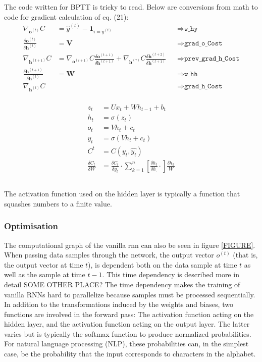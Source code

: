 \documentclass[12pt]{article}
\begin{document}
The code written for BPTT is tricky to read. Below are conversions from math to code for gradient calculation of eq. (21):
\begin{align*}
    \nabla_{\mathbf{o}^{(t)}} C &= \hat{y}^{(t)} - \mathbf{1}_{i=y^{(t)}} &&\Rightarrow \texttt{w\_hy} \\
    \frac{\delta \mathbf{o}^{(t)}}{\delta \mathbf{h}^{(t)}} &= \mathbf{V} &&\Rightarrow \texttt{grad\_o\_Cost} \\
    \nabla_{\mathbf{h}^{(t+1)}} C &= \nabla_{\mathbf{o}^{(t+1)}}C \frac{\delta \mathbf{o}^{(t+1)}}{\delta \mathbf{h}^{(t+1)}} + \nabla_{\mathbf{h}^{(\tau)}}C \frac{\delta \mathbf{h}^{(t+2)}}{\delta \mathbf{h}^{(t+1)}} &&\Rightarrow \texttt{prev\_grad\_h\_Cost} \\
    \frac{\delta \mathbf{h}^{(t+1)}}{\delta \mathbf{h}^{(t)}} &= \mathbf{W} &&\Rightarrow \texttt{w\_hh} \\
    \nabla_{\mathbf{h}^{(t)}} C &&&\Rightarrow \texttt{grad\_h\_Cost} \\
\end{align*}

\begin{align*}
    z_t &= Ux_t + Wh_{t-1} + b_t \\
    h_t &=  \sigma(z_t) \\
    o_t &=  Vh_t + c_t \\
    y_t &=  \sigma(Vh_t + c_t) \\
    C^t &= C(y_t,\hat{y_t}) \\
    \frac{\delta C_t}{\delta W} &= \frac{\delta C_t}{\delta y_t}
    \cdot \sum^n_{k=1}\left[\frac{\delta h_t}{\delta h_.}\cdot\right] \frac{\delta h_k}{W}
\end{align*}


\subsection{}
The activation function used on the hidden layer is typically a function that squashes numbers to a finite value.
\subsubsection*{Optimisation}

The computational graph of the vanilla \gls{rnn} can also be seen in figure \cref{FIGURE}. \\
When passing data samples through the network, the output vector $o^{(t)}$ (that is, the output vector at time $t$), is dependent both on the data sample at time $t$ as well as the sample at time $t-1$. This time dependency is described more in detail SOME OTHER PLACE? The time dependency makes the training of vanilla RNNs hard to parallelize because samples must be processed sequentially. In addition to the transformations induced by the weights and biases, two functions are involved in the forward pass: The activation function acting on the hidden layer, and the activation function acting on the output layer. The latter varies but is typically the softmax function to produce normalized probabilities. For natural language processing (NLP), these probabilities can, in the simplest case, be the probability that the input corresponds to characters in the alphabet.
\end{document}
